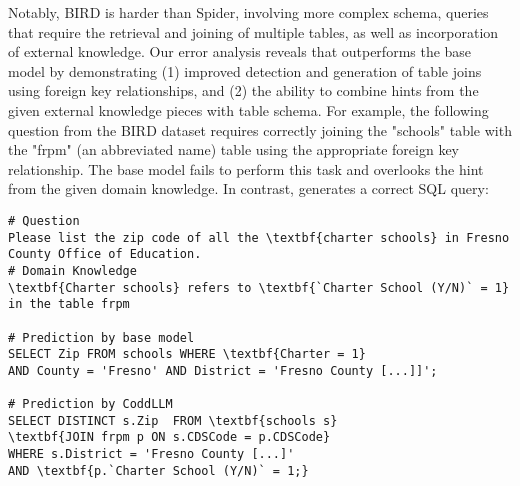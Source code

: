 Notably, BIRD is harder than Spider, involving more complex schema, queries that require the retrieval and joining of multiple tables, as well as incorporation of external knowledge. Our error analysis reveals that \modelname outperforms the base model by demonstrating (1) improved detection and generation of table joins using foreign key relationships,  
and (2) the ability to combine hints from the given external knowledge pieces with table schema.
For example, the following question from the BIRD dataset requires correctly joining the "schools" table with the "frpm" (an abbreviated name) table using the appropriate foreign key relationship. The base model fails to perform this task and overlooks the hint from the given domain knowledge. In contrast, \modelname generates a correct SQL query:

\begin{tcolorbox}[left=1pt, right=0pt, top=1pt, bottom=1pt]
\begin{Verbatim}
# Question
Please list the zip code of all the \textbf{charter schools} in Fresno 
County Office of Education.
# Domain Knowledge
\textbf{Charter schools} refers to \textbf{`Charter School (Y/N)` = 1} 
in the table frpm

# Prediction by base model
SELECT Zip FROM schools WHERE \textbf{Charter = 1} 
AND County = 'Fresno' AND District = 'Fresno County [...]]';

# Prediction by CoddLLM
SELECT DISTINCT s.Zip  FROM \textbf{schools s}
\textbf{JOIN frpm p ON s.CDSCode = p.CDSCode} 
WHERE s.District = 'Fresno County [...]' 
AND \textbf{p.`Charter School (Y/N)` = 1;}
\end{Verbatim}
\end{tcolorbox}
